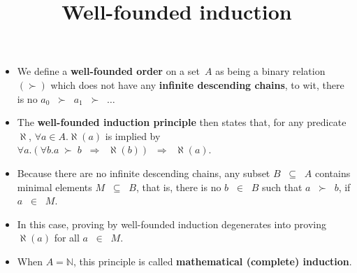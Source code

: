 \documentclass[wide]{slides}
\begin{document}
\begin{slide}
  \title{Well\hyp{}founded induction}

  \begin{itemize}

    \item We define a \textbf{well\hyp{}founded order} on a set~\(A\)
      as being a binary relation~\((\succ)\) which does not have any
      \textbf{infinite descending chains}, to wit, there is no \(a_0
      \;\; \succ \;\; a_1 \;\; \succ \;\; \dots\)

    \item The \textbf{well\hyp{}founded induction principle} then
      states that, for any predicate~\(\aleph\), \(\forall a \in
      A.\aleph(a)\) is implied by \(\forall a.(\forall b.a \; \succ \;
      b \;\; \Rightarrow \;\; \aleph(b)) \;\; \Rightarrow \;\;
      \aleph(a)\).

    \item Because there are no infinite descending chains, any subset
      \(B \;\; \subseteq \;\; A\) contains minimal elements \(M \;\;
      \subseteq \;\; B\), that is, there is no \(b \;\; \in \;\; B\)
      such that \(a \;\; \succ \;\; b\), if \(a \;\; \in \;\; M\).

    \item In this case, proving by well\hyp{}founded induction
      degenerates into proving \(\aleph(a)\) for all \(a \;\; \in \;\;
      M\).

    \item When \(A = \mathbb{N}\), this principle is called
      \textbf{mathematical (complete) induction}.

  \end{itemize}

\end{slide}
\end{document}
